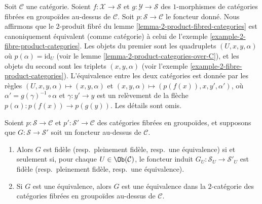 \begin{remark}
\label{remark-2-product-fibred-categories-same}
Soit $\mathcal{C}$ une catégorie. Soient $f : \mathcal{X} \to \mathcal{S}$
et $g : \mathcal{Y} \to \mathcal{S}$ des $1$-morphismes de
catégories fibrées en groupoïdes au-dessus de $\mathcal{C}$.
Soit $p : \mathcal{S} \to \mathcal{C}$ le foncteur donné.
Nous affirmons que le $2$-produit fibré du lemme \ref{lemma-2-product-fibred-categories}
est canoniquement équivalent (comme catégorie) à celui de
l'exemple \ref{example-2-fibre-product-categories}.
Les objets du premier sont les quadruplets $(U, x, y, \alpha)$
où $p(\alpha) = \text{id}_U$
(voir le lemme \ref{lemma-2-product-categories-over-C}),
et les objets du second sont les triplets $(x, y, \alpha)$ (voir
l'exemple \ref{example-2-fibre-product-categories}).
L'équivalence entre les deux catégories est donnée par
les règles $(U, x, y, \alpha) \mapsto (x, y, \alpha)$
et $(x, y, \alpha) \mapsto (p(f(x)), x, y', \alpha')$,
où $\alpha' = g(\gamma)^{-1} \circ \alpha$ et $\gamma : y' \to y$
est un relèvement de la flèche $p(\alpha) : p(f(x)) \to p(g(y))$.
Les détails sont omis.
\end{remark}

\begin{lemma}
\label{lemma-equivalence-fibred-categories}
Soient $p : \mathcal{S}\to \mathcal{C}$ et
$p' : \mathcal{S'}\to \mathcal{C}$ des catégories fibrées en groupoïdes, et
supposons que $G : \mathcal{S}\to \mathcal {S}'$ soit un foncteur au-dessus de
$\mathcal{C}$.
\begin{enumerate}
\item Alors $G$ est fidèle (resp.\ pleinement fidèle, resp.\ une équivalence)
si et seulement si, pour chaque $U\in\Ob(\mathcal{C})$, le foncteur induit
$G_U : \mathcal{S}_U\to \mathcal{S}'_U$ est fidèle
(resp.\ pleinement fidèle, resp.\ une équivalence).
\item Si $G$ est une équivalence, alors $G$ est une équivalence dans la
$2$-catégorie des catégories fibrées en groupoïdes au-dessus de $\mathcal{C}$.
\end{enumerate}
\end{lemma}

